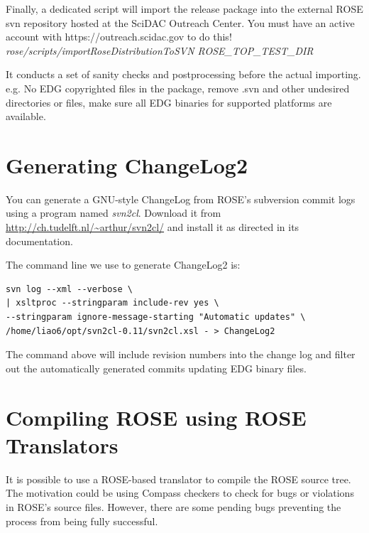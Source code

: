 Finally, a dedicated script will import the release package into the
external ROSE svn repository hosted at the SciDAC Outreach Center. You must
have an active account with https://outreach.scidac.gov to do this!\\

\textit{rose/scripts/importRoseDistributionToSVN ROSE\_TOP\_TEST\_DIR}

It conducts a set of sanity checks and postprocessing before the actual importing. e.g. No EDG copyrighted files in the package, remove .svn and other undesired directories or files, make sure all EDG binaries for supported platforms are available.

\section{Generating ChangeLog2}%
You can generate a GNU-style ChangeLog from ROSE's subversion commit logs using a program named \textit{svn2cl}. 
Download it from \url{http://ch.tudelft.nl/~arthur/svn2cl/}
and install it as directed in its documentation. 

The command line we use to generate ChangeLog2 is:
\begin{verbatim}
svn log --xml --verbose \
| xsltproc --stringparam include-rev yes \
--stringparam ignore-message-starting "Automatic updates" \
/home/liao6/opt/svn2cl-0.11/svn2cl.xsl - > ChangeLog2
\end{verbatim}
The command above will include revision numbers into the change log and
filter out the automatically generated commits updating EDG binary files.


\section{Compiling ROSE using ROSE Translators}%
It is possible to use a ROSE-based translator to compile the ROSE source
tree.
The motivation could be using Compass checkers to check for bugs or
violations in ROSE's source files. 
However, there are some pending bugs preventing the process from being fully successful.  

